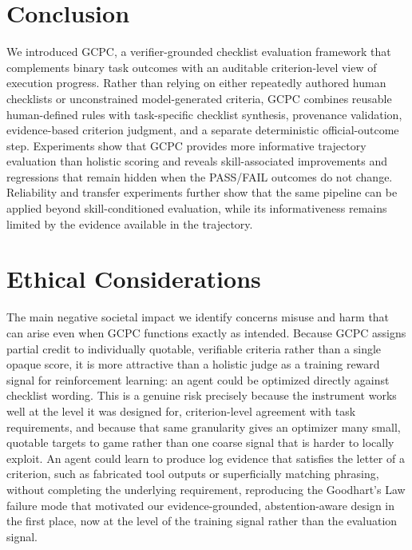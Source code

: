 \documentclass[sigconf,nonacm]{acmart}
\begin{document}
\section{Conclusion}
We introduced GCPC, a verifier-grounded checklist evaluation framework that complements binary task outcomes with an auditable criterion-level view of execution progress. Rather than relying on either repeatedly authored human checklists or unconstrained model-generated criteria, GCPC combines reusable human-defined rules with task-specific checklist synthesis, provenance validation, evidence-based criterion judgment, and a separate deterministic official-outcome step. Experiments show that GCPC provides more informative trajectory evaluation than holistic scoring and reveals skill-associated improvements and regressions that remain hidden when the PASS/FAIL outcomes do not change. Reliability and transfer experiments further show that the same pipeline can be applied beyond skill-conditioned evaluation, while its informativeness remains limited by the evidence available in the trajectory.

\section*{Ethical Considerations}


The main negative societal impact we identify concerns misuse and harm that
can arise even when GCPC functions exactly as intended. Because GCPC assigns
partial credit to individually quotable, verifiable criteria rather than a
single opaque score, it is more attractive than a holistic judge as a
training reward signal for reinforcement learning: an agent could be
optimized directly against checklist wording. This is a genuine risk
precisely because the instrument works well at the level it was designed
for, criterion-level agreement with task requirements, and because that
same granularity gives an optimizer many small, quotable targets to
game rather than one coarse signal that is harder to locally exploit. An
agent could learn to produce log evidence that satisfies the letter of a
criterion, such as fabricated tool outputs or superficially matching phrasing,
without completing the underlying requirement, reproducing the Goodhart's
Law failure mode that motivated our evidence-grounded, abstention-aware
design in the first place, now at the level of the training signal rather
than the evaluation signal.
\end{document}
